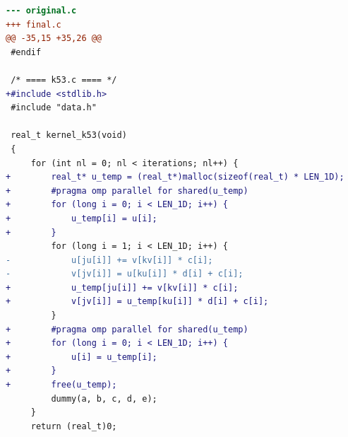 \begin{lstlisting}[language=diff,basicstyle=\ttfamily\scriptsize,breaklines=true,caption={tsvc_c2/k53 — parallel-not-faster (e2v6_fb_3)}]
--- original.c
+++ final.c
@@ -35,15 +35,26 @@
 #endif
 
 /* ==== k53.c ==== */
+#include <stdlib.h>
 #include "data.h"
 
 real_t kernel_k53(void)
 {
     for (int nl = 0; nl < iterations; nl++) {
+        real_t* u_temp = (real_t*)malloc(sizeof(real_t) * LEN_1D);
+        #pragma omp parallel for shared(u_temp) 
+        for (long i = 0; i < LEN_1D; i++) {
+            u_temp[i] = u[i];
+        }
         for (long i = 1; i < LEN_1D; i++) {
-            u[ju[i]] += v[kv[i]] * c[i];
-            v[jv[i]] = u[ku[i]] * d[i] + c[i];
+            u_temp[ju[i]] += v[kv[i]] * c[i];
+            v[jv[i]] = u_temp[ku[i]] * d[i] + c[i];
         }
+        #pragma omp parallel for shared(u_temp) 
+        for (long i = 0; i < LEN_1D; i++) {
+            u[i] = u_temp[i];
+        }
+        free(u_temp);
         dummy(a, b, c, d, e);
     }
     return (real_t)0;
\end{lstlisting}
